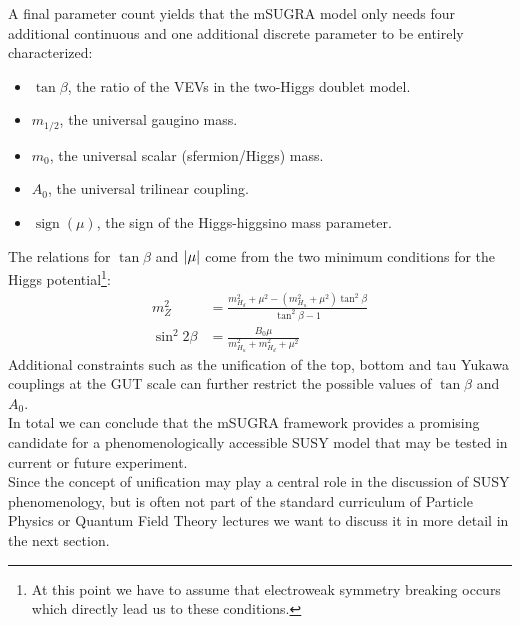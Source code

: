 \noindent A final parameter count yields that the mSUGRA model only needs four additional continuous and one additional discrete parameter to be entirely characterized:
\begin{itemize}
	\item $\tan\beta$, the ratio of the VEVs in the two-Higgs doublet model.
	\item $m_{1/2}$, the universal gaugino mass.
	\item $m_{0}$, the universal scalar (sfermion/Higgs) mass.
	\item $A_{0}$, the universal trilinear coupling.
	\item $\operatorname{sign}(\mu)$, the sign of the Higgs-higgsino mass parameter.
\end{itemize}
The relations for $\tan\beta$ and $\abs{\mu}$ come from the two minimum conditions for the Higgs potential\footnote{At this point we have to assume that electroweak symmetry breaking occurs which directly lead us to these conditions.}:
\begin{align}
	m_Z^2 &= \frac{m_{H_d}^2 + \mu^2 - (m_{H_u}^2 + \mu^2)\tan^2\beta}{\tan^2\beta -1} \\
	\sin^2 2\beta &= \frac{B_0\mu}{m_{H_u}^2 + m_{H_d}^2 + \mu^2}
\end{align}
Additional constraints such as the unification of the top, bottom and tau Yukawa couplings at the GUT scale can further restrict the possible values of $\tan\beta$ and $A_0$.\\ In total we can conclude that the mSUGRA framework provides a promising candidate for a phenomenologically accessible SUSY model that may be tested in current or future experiment. \\ Since the concept of unification may play a central role in the discussion of SUSY phenomenology, but is often not part of the standard curriculum of Particle Physics or Quantum Field Theory lectures we want to discuss it in more detail in the next section.